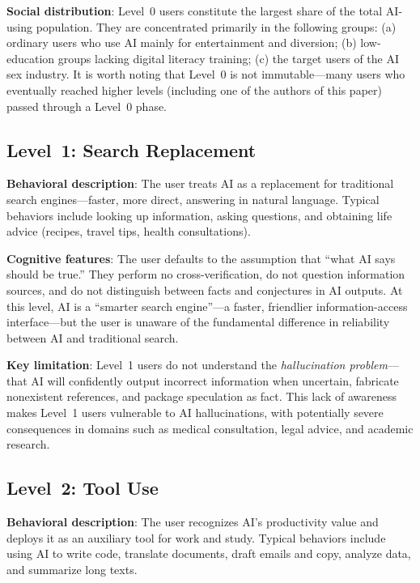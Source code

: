 ﻿\documentclass[12pt,a4paper]{article}
\begin{document}
\textbf{Social distribution}: Level~0 users constitute the largest share of the total AI-using population. They are concentrated primarily in the following groups: (a) ordinary users who use AI mainly for entertainment and diversion; (b) low-education groups lacking digital literacy training; (c) the target users of the AI sex industry. It is worth noting that Level~0 is not immutable---many users who eventually reached higher levels (including one of the authors of this paper) passed through a Level~0 phase.

\subsection{Level~1: Search Replacement}

\textbf{Behavioral description}: The user treats AI as a replacement for traditional search engines---faster, more direct, answering in natural language. Typical behaviors include looking up information, asking questions, and obtaining life advice (recipes, travel tips, health consultations).

\textbf{Cognitive features}: The user defaults to the assumption that ``what AI says should be true.'' They perform no cross-verification, do not question information sources, and do not distinguish between facts and conjectures in AI outputs. At this level, AI is a ``smarter search engine''---a faster, friendlier information-access interface---but the user is unaware of the fundamental difference in reliability between AI and traditional search.

\textbf{Key limitation}: Level~1 users do not understand the \textit{hallucination problem}---that AI will confidently output incorrect information when uncertain, fabricate nonexistent references, and package speculation as fact. This lack of awareness makes Level~1 users vulnerable to AI hallucinations, with potentially severe consequences in domains such as medical consultation, legal advice, and academic research.

\subsection{Level~2: Tool Use}

\textbf{Behavioral description}: The user recognizes AI's productivity value and deploys it as an auxiliary tool for work and study. Typical behaviors include using AI to write code, translate documents, draft emails and copy, analyze data, and summarize long texts.
\end{document}
